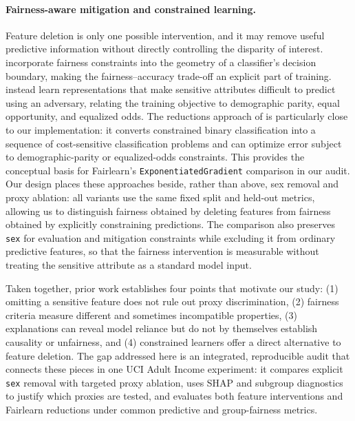 \documentclass{article}
\begin{document}
\paragraph{Fairness-aware mitigation and constrained learning.}
Feature deletion is only one possible intervention, and it may remove useful
predictive information without directly controlling the disparity of interest.
\citet{zafar2017fairness} incorporate fairness constraints into the geometry of
a classifier's decision boundary, making the fairness--accuracy trade-off an
explicit part of training. \citet{madras2018learning} instead learn
representations that make sensitive attributes difficult to predict using an
adversary, relating the training objective to demographic parity, equal
opportunity, and equalized odds. The reductions approach of
\citet{agarwal2018reductions} is particularly close to our implementation:
it converts constrained binary classification into a sequence of
cost-sensitive classification problems and can optimize error subject to
demographic-parity or equalized-odds constraints. This provides the conceptual
basis for Fairlearn's \texttt{ExponentiatedGradient} comparison in our audit.
Our design places these approaches beside, rather than above, sex removal and
proxy ablation: all variants use the same fixed split and held-out metrics,
allowing us to distinguish fairness obtained by deleting features from fairness
obtained by explicitly constraining predictions. The comparison also preserves
\texttt{sex} for evaluation and mitigation constraints while excluding it from
ordinary predictive features, so that the fairness intervention is measurable
without treating the sensitive attribute as a standard model input.

Taken together, prior work establishes four points that motivate our study:
(1) omitting a sensitive feature does not rule out proxy discrimination, 
(2) fairness criteria measure different and sometimes incompatible properties, 
(3) explanations can reveal model reliance but do not by themselves establish causality or
unfairness, and (4) constrained learners offer a direct alternative to feature deletion. 
The gap addressed here is an integrated, reproducible audit that
connects these pieces in one UCI Adult Income experiment: it compares explicit
\texttt{sex} removal with targeted proxy ablation, uses SHAP and subgroup
diagnostics to justify which proxies are tested, and evaluates both feature
interventions and Fairlearn reductions under common predictive and group-fairness metrics.
\end{document}
